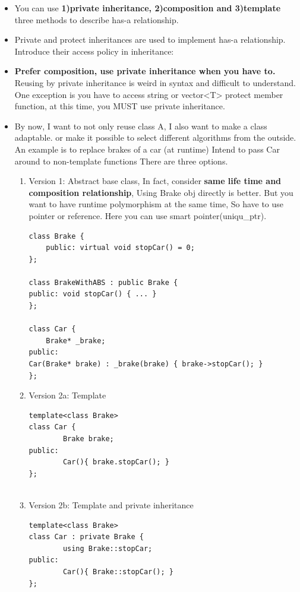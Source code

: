 \documentclass[a4paper,11pt,twoside]{book}
\begin{document}
\begin{itemize}
	\item You can use \textbf{1)private inheritance, 2)composition and 3)template} three methods to describe has-a relationship.
	
	\item Private and protect inheritances are used to implement has-a relationship. Introduce their access policy in inheritance:

	\item \textbf{Prefer composition, use private inheritance when you have to.} Reusing by private inheritance is weird in syntax and difficult to understand. One exception is you have to access string or vector<T> protect member function, at this time, you MUST use private inheritance.
	
	\item By now, I want to not only reuse class A, I also want to make a class adaptable. or make it possible to select different algorithms from the outside.  An example is  to replace brakes of a car (at runtime) Intend to pass Car around to non-template functions There are three options.
	\begin{enumerate}
		\item Version 1: Abstract base class, In fact, consider \textbf{same life time and composition relationship},  Using Brake obj directly is better. But you want to have runtime polymorphism at the same time, So have to use pointer or reference. Here you can use smart pointer(uniqu\_ptr).
\begin{lstlisting}[numbers=none]
class Brake {
	public: virtual void stopCar() = 0;
};
		
class BrakeWithABS : public Brake {
public: void stopCar() { ... }
};
		
class Car {
	Brake* _brake;
public:
Car(Brake* brake) : _brake(brake) { brake->stopCar(); }
};
\end{lstlisting}
		
		\item Version 2a: Template
		
\begin{lstlisting}[numbers=none]
template<class Brake>
class Car {
		Brake brake;
public:
		Car(){ brake.stopCar(); }
};
		
\end{lstlisting}
		\item Version 2b: Template and private inheritance
\begin{lstlisting}[numbers=none]
template<class Brake>
class Car : private Brake {
		using Brake::stopCar;
public:
		Car(){ Brake::stopCar(); }
};
\end{lstlisting}
	\end{enumerate}
	

\end{itemize}
\end{document}
